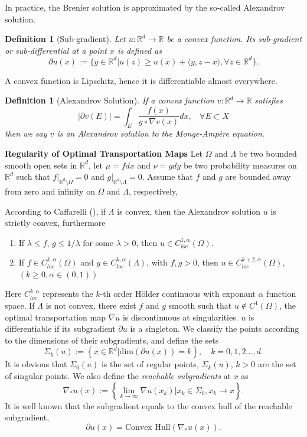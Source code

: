 \documentclass{article}
\newtheorem{definition}[theorem]{Definition}
\begin{document}
In practice, the Brenier solution is approximated by the so-called Alexandrov solution.
\begin{definition}[Sub-gradient]
Let $u:\mathbb{R}^d\to\mathbb{R}$ be a convex function. Its \emph{sub-gradient or sub-differential} at a point $x$ is defined as
\begin{equation}
    \partial u(x) := \{ y\in \mathbb{R}^d | u(z)\ge u(x) + \langle y, z-x\rangle , \forall z\in \mathbb{R}^d\}.
\end{equation}
\end{definition}
A convex function is Lipschitz, hence it is differentiable almost everywhere.
\begin{definition}[Alexandrov Solution]
If a convex function $v:\mathbb{R}^d\to\mathbb{R}$ satisfies
\begin{equation}
    |\partial v(E)| = \int_E \frac{f(x)}{g\circ \nabla v(x)} dx,~~~~\forall E\subset X
\end{equation}
then we say $v$ is an Alexandrov solution to the Monge-Amp\`{e}re equation.
\end{definition}



\noindent\textbf{Regularity of Optimal Transportation Maps}
Let $\Omega$ and $\Lambda$ be two bounded smooth open sets in $\mathbb{R}^d$, let $\mu=fdx$ and $\nu=gdy$ be two probability measures on $\mathbb{R}^d$ such that $f|_{\mathbb{R}^d\setminus \Omega}=0$ and $g|_{\mathbb{R}^d\setminus \Lambda}=0$. Assume that $f$ and $g$ are bounded away from zero and infinity on $\Omega$ and $\Lambda$, respectively,

According to Caffarelli (\cite{caffarelli1992regularity}), if $\Lambda$ is convex, then the Alexandrov solution $u$ is strictly convex, furthermore
\begin{enumerate}
    \item If $\lambda \le f$, $g\le 1/\lambda$ for some $\lambda > 0$, then $u\in C_{loc}^{1,\alpha}(\Omega)$.
    \item If $f\in C_{loc}^{k,\alpha}(\Omega)$ and $g\in C_{loc}^{k,\alpha}(\Lambda)$, with $f,g>0$, then $u\in C_{loc}^{k+2,\alpha}(\Omega)$, $(k\ge 0, \alpha\in (0,1))$
\end{enumerate}
Here $C_{loc}^{k,\alpha}$ represents the $k$-th order H\"{o}lder continuous with exponant $\alpha$ function space. If $\Lambda$ is not convex, there exist $f$ and $g$ smooth such that $u\not\in C^1(\Omega)$, the optimal transportation map $\nabla u$ is discontinuous at singularities. $u$ is differentiable if its subgradient $\partial u$ is a singleton. We classify the points according to the dimensions of their subgradients, and define the sets
\[
    \Sigma_k(u) := \left\{ x\in \mathbb{R}^d| \text{dim}(\partial u(x))= k \right\}, \quad k=0,1,2\dots, d.
\]
It is obvious that $\Sigma_0(u)$ is the set of regular points, $\Sigma_k(u)$, $k>0$ are the set of singular points. We also define the \emph{reachable subgradients} at $x$ as
\[
    \nabla_{*} u(x):= \left\{ \lim_{k\to \infty } \nabla u(x_k) | x_k \in \Sigma_0, x_k \to x \right\}.
\]
It is well known that the subgradient equals to the convex hull of the reachable subgradient,
\[
    \partial u(x) = \text{Convex Hull}(\nabla_* u(x)).
\]
\end{document}
